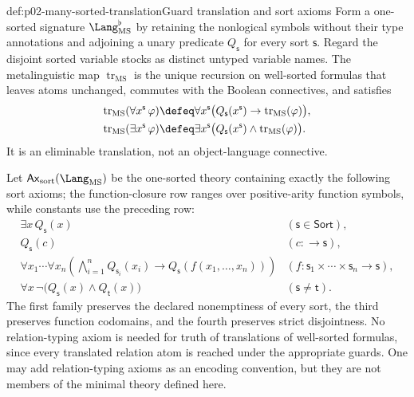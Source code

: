 \begin{hbdefinition}{def:p02-many-sorted-translation}{Guard translation and sort axioms}
Form a one-sorted signature \(\Lang_{\mathrm{MS}}^{\flat}\) by retaining the
nonlogical symbols without their type annotations and adjoining a unary
predicate \(Q_{\mathsf s}\) for every sort \(\mathsf s\).  Regard the disjoint sorted variable
stocks as distinct untyped variable names.  The metalinguistic map
\(\operatorname{tr}_{\mathrm{MS}}\) is the unique recursion on well-sorted
formulas that leaves atoms unchanged, commutes with the Boolean connectives,
and satisfies
\[
\begin{aligned}
 \operatorname{tr}_{\mathrm{MS}}(\forall x^{\mathsf s}\,\varphi)
   &\defeq \forall x^{\mathsf s}\bigl(Q_{\mathsf s}(x^{\mathsf s})\to
        \operatorname{tr}_{\mathrm{MS}}(\varphi)\bigr),\\
 \operatorname{tr}_{\mathrm{MS}}(\exists x^{\mathsf s}\,\varphi)
   &\defeq \exists x^{\mathsf s}\bigl(Q_{\mathsf s}(x^{\mathsf s})\land
        \operatorname{tr}_{\mathrm{MS}}(\varphi)\bigr).
\end{aligned}
\]
It is an eliminable translation, not an object-language connective.

Let \(\mathsf{Ax}_{\mathrm{sort}}(\Lang_{\mathrm{MS}})\) be the one-sorted
theory containing exactly the following sort axioms; the function-closure row
ranges over positive-arity function symbols, while constants use the preceding
row:
\[
\begin{array}{ll}
 \exists x\,Q_{\mathsf s}(x) & (\mathsf s\in\mathsf{Sort}),\\[2pt]
 Q_{\mathsf s}(c) & (c:\longrightarrow\mathsf s),\\[2pt]
 \displaystyle
 \forall x_1\cdots\forall x_n
 \left(\bigwedge_{i=1}^{n}Q_{\mathsf s_i}(x_i)
 \to Q_{\mathsf s}(f(x_1,\ldots,x_n))\right)
 & (f:\mathsf s_1\times\cdots\times\mathsf s_n\longrightarrow\mathsf s),\\[6pt]
 \forall x\,\neg\bigl(Q_{\mathsf s}(x)\land Q_{\mathsf t}(x)\bigr)
 & (\mathsf s\ne\mathsf t).
\end{array}
\]
The first family preserves the declared nonemptiness of every sort, the third
preserves function codomains, and the fourth preserves strict disjointness.
No relation-typing axiom is needed for truth of translations of well-sorted
formulas, since every translated relation atom is reached under the appropriate
guards.  One may add relation-typing axioms as an encoding convention, but
they are not members of the minimal theory defined here.

\end{hbdefinition}

